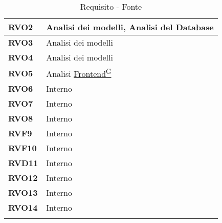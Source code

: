 \begin{longtable}{|>{\centering\arraybackslash}m{}|>{\centering\arraybackslash}m{}|}
	\textbf{RVO2}			 & Analisi dei modelli, Analisi del Database\\\hline
	\textbf{RVO3}			 & Analisi dei modelli\\\hline
	\textbf{RVO4}			 & Analisi dei modelli\\\hline
	\textbf{RVO5}			 & Analisi \href{https://code7crusaders.github.io/docs/RTB/documentazione_interna/glossario.html#frontend}{Frontend\textsuperscript{G}}\\\hline
	\textbf{RVO6}			 & Interno\\\hline
	\textbf{RVO7}			 & Interno\\\hline
	\textbf{RVO8}			 & Interno\\\hline
	\textbf{RVF9}			 & Interno\\\hline
	\textbf{RVF10}			 & Interno\\\hline
	\textbf{RVD11}			 & Interno\\\hline
	\textbf{RVO12}			 & Interno\\\hline
	\textbf{RVO13}			 & Interno\\\hline
	\textbf{RVO14}			 & Interno\\\hline
	\caption{Requisito - Fonte}
\end{longtable}
